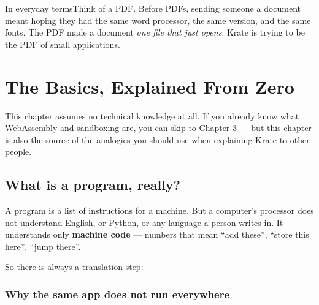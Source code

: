 \documentclass[11pt,a4paper]{report}
\newcommand{\analogy}[1]{\begin{plainbox}{In everyday terms}#1\end{plainbox}}
\begin{document}
\analogy{Think of a PDF. Before PDFs, sending someone a document meant
hoping they had the same word processor, the same version, and the same
fonts. The PDF made a document \emph{one file that just opens}. Krate is
trying to be the PDF of small applications.}

\chapter{The Basics, Explained From Zero}

This chapter assumes no technical knowledge at all. If you already know
what WebAssembly and sandboxing are, you can skip to Chapter 3 --- but
this chapter is also the source of the analogies you should use when
explaining Krate to other people.

\section{What is a program, really?}

A program is a list of instructions for a machine. But a computer's
processor does not understand English, or Python, or any language a person
writes in. It understands only \textbf{machine code} --- numbers that mean
``add these'', ``store this here'', ``jump there''.

So there is always a translation step:

\begin{center}
\end{center}

\subsection{Why the same app does not run everywhere}
\end{document}

